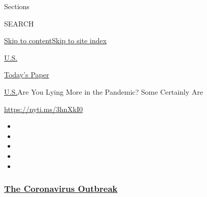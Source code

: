 Sections

SEARCH

\protect\hyperlink{site-content}{Skip to
content}\protect\hyperlink{site-index}{Skip to site index}

\href{https://www.nytimes3xbfgragh.onion/section/us}{U.S.}

\href{https://myaccount.nytimes3xbfgragh.onion/auth/login?response_type=cookie\&client_id=vi}{}

\href{https://www.nytimes3xbfgragh.onion/section/todayspaper}{Today's
Paper}

\href{/section/us}{U.S.}\textbar{}Are You Lying More in the Pandemic?
Some Certainly Are

\url{https://nyti.ms/3hnXkI0}

\begin{itemize}
\item
\item
\item
\item
\item
\end{itemize}

\hypertarget{the-coronavirus-outbreak}{%
\subsubsection{\texorpdfstring{\href{https://www.nytimes3xbfgragh.onion/news-event/coronavirus?name=styln-coronavirus-national\&region=TOP_BANNER\&block=storyline_menu_recirc\&action=click\&pgtype=Article\&impression_id=c3673060-f52b-11ea-8964-d1c7703f36aa\&variant=undefined}{The
Coronavirus
Outbreak}}{The Coronavirus Outbreak}}\label{the-coronavirus-outbreak}}

